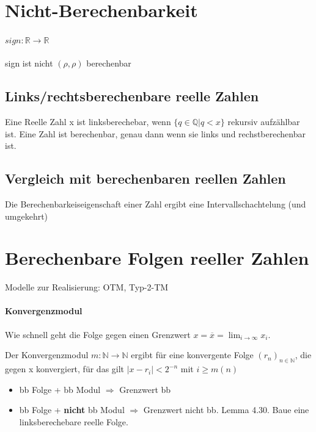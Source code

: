 \documentclass[ngerman]{scrartcl}
\begin{document}
%
%
\section{Nicht-Berechenbarkeit}

\paragraph{$ sign : \mathbb{R} \rightarrow \mathbb{R} $} sign ist nicht $ (\rho, \rho)$ berechenbar


\subsection{Links/rechtsberechenbare reelle Zahlen}
Eine Reelle Zahl x ist linksberechebar, wenn $ \{q \in \mathbb{Q} | q < x  \}  $ rekursiv aufzählbar ist.  Eine Zahl ist berechenbar, genau dann wenn sie links und rechstberechenbar ist.

\subsection{Vergleich mit berechenbaren reellen Zahlen}
Die Berechenbarkeiseigenschaft einer Zahl ergibt eine Intervallschachtelung (und umgekehrt)


%
%
\section{Berechenbare Folgen reeller Zahlen}

Modelle zur Realisierung: OTM, Typ-2-TM

\paragraph{Konvergenzmodul}
Wie schnell geht die Folge gegen einen Grenzwert $ x = \overline{x} = \lim_{i \rightarrow \infty} x_ i $.

Der Konvergenzmodul $ m : \mathbb{N} \rightarrow \mathbb{N} $ ergibt für eine konvergente Folge $ (r_n)_{n \in \mathbb {N}}$, die gegen x konvergiert, für das gilt $ |x - r_i| < 2^{-n} $ mit $ i \geq m(n)$
\begin{itemize}
  \item bb Folge + bb Modul $ \Rightarrow $ Grenzwert bb
  \item bb Folge + \textbf{nicht} bb Modul $ \Rightarrow $ Grenzwert nicht bb. Lemma 4.30. Baue eine linksberechebare reelle Folge.
\end{itemize}
\end{document}

